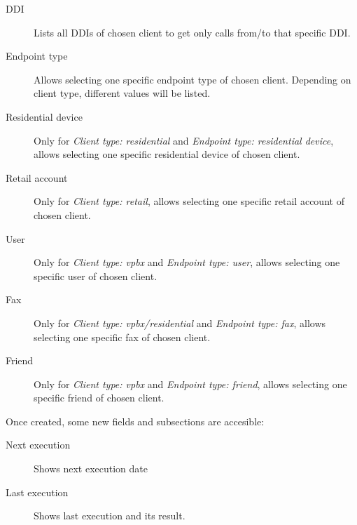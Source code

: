 \documentclass[letterpaper,10pt,spanish]{sphinxmanual}
\begin{document}
\begin{description}
\item[{DDI}] \leavevmode{}\label{administration_portal/brand/calls/call_csv_schedulers:term-ddi}
Lists all DDIs of chosen client to get only calls from/to that specific DDI.

\item[{Endpoint type}] \leavevmode{}\label{administration_portal/brand/calls/call_csv_schedulers:term-endpoint-type}
Allows selecting one specific endpoint type of chosen client. Depending on client type, different values will
be listed.

\item[{Residential device}] \leavevmode{}\label{administration_portal/brand/calls/call_csv_schedulers:term-residential-device}
Only for \emph{Client type: residential} and \emph{Endpoint type: residential device}, allows selecting one specific residential device of chosen client.

\item[{Retail account}] \leavevmode{}\label{administration_portal/brand/calls/call_csv_schedulers:term-retail-account}
Only for \emph{Client type: retail}, allows selecting one specific retail account of chosen client.

\item[{User}] \leavevmode{}\label{administration_portal/brand/calls/call_csv_schedulers:term-user}
Only for \emph{Client type: vpbx} and \emph{Endpoint type: user}, allows selecting one specific user of chosen client.

\item[{Fax}] \leavevmode{}\label{administration_portal/brand/calls/call_csv_schedulers:term-fax}
Only for \emph{Client type: vpbx/residential} and \emph{Endpoint type: fax}, allows selecting one specific fax of chosen client.

\item[{Friend}] \leavevmode{}\label{administration_portal/brand/calls/call_csv_schedulers:term-friend}
Only for \emph{Client type: vpbx} and \emph{Endpoint type: friend}, allows selecting one specific friend of chosen client.

\end{description}

Once created, some new fields and subsections are accesible:
\begin{description}
\item[{Next execution}] \leavevmode{}\label{administration_portal/brand/calls/call_csv_schedulers:term-next-execution}
Shows next execution date

\item[{Last execution}] \leavevmode{}\label{administration_portal/brand/calls/call_csv_schedulers:term-last-execution}
Shows last execution and its result.

\end{description}
\end{document}
